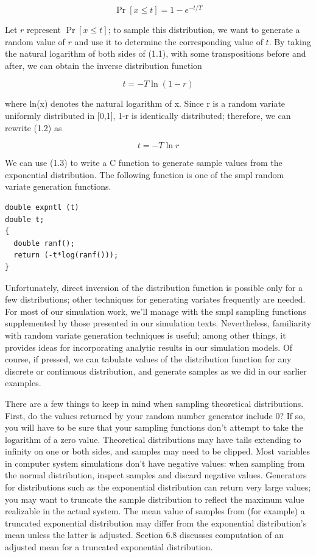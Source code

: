 \begin{equation}
\Pr[x\leq t] = 1 - e^{-t/T} \tag{1.1}\label{eq:exp-cdf}
\end{equation}

Let $r$ represent $\Pr[x\leq t]$; to sample this distribution, we want to generate a
random value of $r$ and use it to determine the corresponding value of $t$. By
taking the natural logarithm of both sides of (1.1), with some transpositions
before and after, we can obtain the inverse distribution function

\begin{equation}
t = -T \ln(1-r) \tag{1.2}
\end{equation}

where ln(x) denotes the natural logarithm of x. Since r is a random variate
uniformly distributed in [0,1], 1-r is identically distributed; therefore, we
can rewrite (1.2) as

\begin{equation}
t = -T \ln r \tag{1.3}
\end{equation}

We can use (1.3) to write a C function to generate
sample values from the exponential distribution. The following function is one
of the smpl random variate generation functions.

\begin{verbatim}
double expntl (t)
double t;
{
  double ranf();
  return (-t*log(ranf()));
}
\end{verbatim}

Unfortunately, direct inversion of the distribution function is possible only
for a few distributions; other techniques for generating variates frequently
are needed. For most of our simulation work, we'll manage with the smpl
sampling functions supplemented by those presented in our simulation texts.
Nevertheless, familiarity with random variate generation techniques is useful;
among other things, it provides ideas for incorporating analytic results in our
simulation models. Of course, if pressed, we can tabulate values of the
distribution function for any discrete or continuous distribution, and generate
samples as we did in our earlier examples.

There are a few things to keep in mind when sampling theoretical distributions.
First, do the values returned by your random number generator include 0? If so,
you will have to be sure that your sampling functions don't attempt to take the
logarithm of a zero value. Theoretical distributions may have tails extending
to infinity on one or both sides, and samples may need to be clipped. Most
variables in computer system simulations don't have negative values: when
sampling from the normal distribution, inspect samples and discard negative
values. Generators for distributions such as the exponential distribution can
return very large values; you may want to truncate the sample distribution to
reflect the maximum value realizable in the actual system. The mean value of
samples from (for example) a truncated exponential distribution may differ from
the exponential distribution's mean unless the latter is adjusted. Section 6.8
discusses computation of an adjusted mean for a truncated exponential
distribution.

